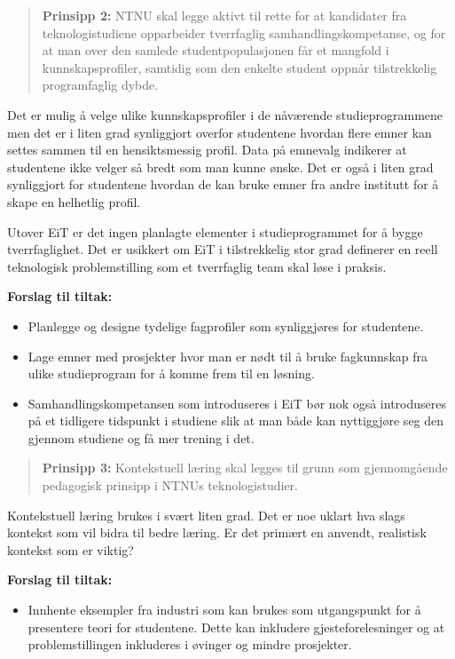\begin{quote}
	\textbf{Prinsipp 2:} NTNU skal legge aktivt til rette for at kandidater fra teknologistudiene opparbeider tverrfaglig samhandlingskompetanse, og for at man over den samlede studentpopulasjonen får et mangfold i kunnskapsprofiler, samtidig som den enkelte student oppnår tilstrekkelig programfaglig dybde.
\end{quote}

Det er mulig å velge ulike kunnskapsprofiler i de nåværende studieprogrammene men det er i liten grad synliggjort overfor studentene hvordan flere emner kan settes sammen til en hensiktsmessig profil. Data på emnevalg indikerer at studentene ikke velger så bredt som man kunne ønske. Det er også i liten grad synliggjort for studentene hvordan de kan bruke emner fra andre institutt for å skape en helhetlig profil.

Utover EiT er det ingen planlagte elementer i studieprogrammet for å bygge tverrfaglighet. Det er usikkert om EiT i tilstrekkelig stor grad definerer en reell teknologisk problemstilling som et tverrfaglig team skal løse i praksis. 

\textbf{Forslag til tiltak:}

\begin{itemize}
    \item Planlegge og designe tydelige fagprofiler som synliggjøres for studentene.
	\item Lage emner med prosjekter hvor man er nødt til å bruke fagkunnskap fra ulike studieprogram for å komme frem til en løsning.
	\item Samhandlingskompetansen som introduseres i EiT bør nok også introduseres på et tidligere tidspunkt i studiene slik at man både kan nyttiggjøre seg den gjennom studiene og få mer trening i det.
\end{itemize}

\begin{quote}
	\textbf{Prinsipp 3:} Kontekstuell læring skal legges til grunn som gjennomgående pedagogisk prinsipp i NTNUs teknologistudier.
\end{quote}

Kontekstuell læring brukes i svært liten grad. Det er noe uklart hva slags kontekst som vil bidra til bedre læring. Er det primært en anvendt, realistisk kontekst som er viktig?

\textbf{Forslag til tiltak:}

\begin{itemize}
    \item Innhente eksempler fra industri som kan brukes som utgangspunkt for å presentere teori for studentene. Dette kan inkludere gjesteforelesninger og at problemstillingen inkluderes i øvinger og mindre prosjekter.
\end{itemize}


